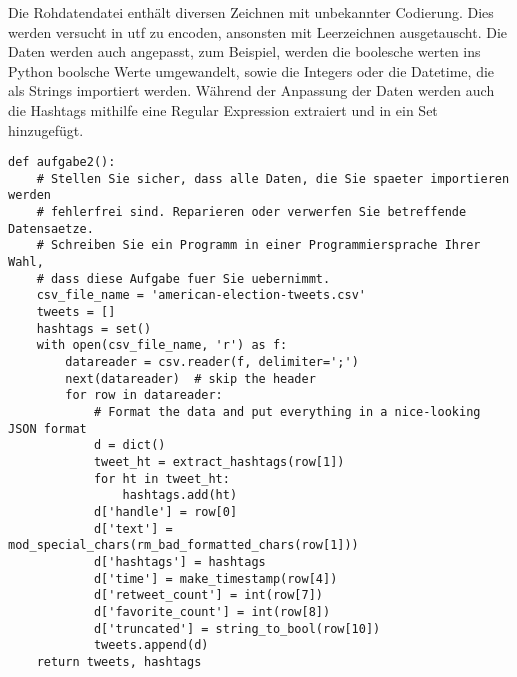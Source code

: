 \documentclass[a4paper]{article}
\begin{document}
Die Rohdatendatei enthält diversen Zeichnen mit unbekannter Codierung. Dies werden versucht in utf zu encoden, ansonsten mit Leerzeichnen ausgetauscht.
Die Daten werden auch angepasst, zum Beispiel, werden die boolesche werten ins Python boolsche Werte umgewandelt, sowie die Integers oder die Datetime, die als Strings importiert werden.
Während der Anpassung der Daten werden auch die Hashtags mithilfe eine Regular Expression extraiert und in ein Set hinzugefügt.
\begin{verbatim}
def aufgabe2():
    # Stellen Sie sicher, dass alle Daten, die Sie spaeter importieren werden
    # fehlerfrei sind. Reparieren oder verwerfen Sie betreffende Datensaetze.
    # Schreiben Sie ein Programm in einer Programmiersprache Ihrer Wahl,
    # dass diese Aufgabe fuer Sie uebernimmt.
    csv_file_name = 'american-election-tweets.csv'
    tweets = []
    hashtags = set()
    with open(csv_file_name, 'r') as f:
        datareader = csv.reader(f, delimiter=';')
        next(datareader)  # skip the header
        for row in datareader:
            # Format the data and put everything in a nice-looking JSON format
            d = dict()
            tweet_ht = extract_hashtags(row[1])
            for ht in tweet_ht:
                hashtags.add(ht)
            d['handle'] = row[0]
            d['text'] = mod_special_chars(rm_bad_formatted_chars(row[1]))
            d['hashtags'] = hashtags
            d['time'] = make_timestamp(row[4])
            d['retweet_count'] = int(row[7])
            d['favorite_count'] = int(row[8])
            d['truncated'] = string_to_bool(row[10])
            tweets.append(d)
    return tweets, hashtags
\end{verbatim}
\end{document}
